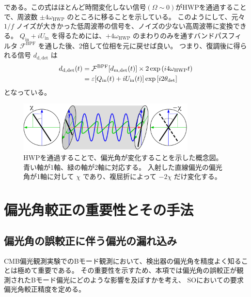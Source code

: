 \documentclass[../../main.tex]{subfiles}
\begin{document}
である。この式はほとんど時間変化しない信号$(\Omega\sim0)$がHWPを通過することで、周波数 $\pm 4\omega_{\mathrm{HWP}}$ のところに移ることを示している。
このようにして、元々 $1/f$ ノイズが大きかった低周波帯の信号を、ノイズの少ない高周波帯に変換できる。
$Q_{\mathrm{in}}+iU_{\mathrm{in}}$ を得るためには、$+4\omega_{\mathrm{HWP}}$ のまわりのみを通すバンドパスフィルタ $\mathcal{F}^{\mathrm{BPF}}$ を通した後、2倍して位相を元に戻せば良い。
つまり、復調後に得られる信号 $d_{\mathrm{d, det}}$ は
\begin{align}
    d_{\mathrm{d, det}}(t) &= \mathcal{F}^{\mathrm{BPF}}\qty[d_{\mathrm{m,det}}(t)]\times 2\exp\qty(i4\omega_{\mathrm{HWP}}t) \\
    &= \varepsilon\qty[Q_{\mathrm{in}}(t) + iU_{\mathrm{in}}(t)]\exp\qty[i2\theta_{\mathrm{det}}]
\end{align}
となっている。

\begin{figure}[H]
    \centering
    \includegraphics[width=0.8\textwidth]{simons_observatory/hwp_satoru.pdf}
    \caption{HWPを通過することで、偏光角が変化することを示した概念図。青い軸が1軸、緑の軸が2軸に対応する。
    入射した直線偏光の偏光角が1軸に対して $\chi$ であり、複屈折によって $-2\chi$ だけ変化する。}
    \label{fig:so-hwp_satoru}
\end{figure}

\section{偏光角較正の重要性とその手法}
\subsection{偏光角の誤較正に伴う偏光の漏れ込み}
CMB偏光観測実験でのBモード観測において、検出器の偏光角を精度よく知ることは極めて重要である。
その重要性を示すため、本項では偏光角の誤較正が観測されたBモード偏光にどのような影響を及ぼすかを考え、
SOにおいての要求偏光角較正精度を定める。
\end{document}
